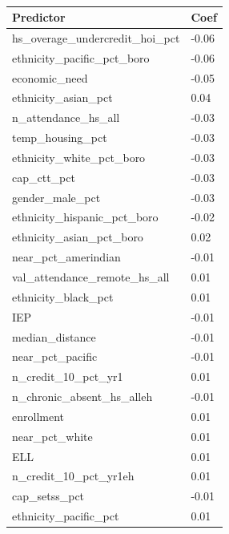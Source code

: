 \documentclass[
  man,floatsintext]{apa6}
\begin{document}
\begin{table}[H]

\begin{center}
\begin{threeparttable}

\caption{\label{tab:unnamed-chunk-13}}

\begin{tabular}{ll}
\toprule
Predictor & \multicolumn{1}{c}{Coef}\\
\midrule
hs\_overage\_undercredit\_hoi\_pct & -0.06\\
ethnicity\_pacific\_pct\_boro & -0.06\\
economic\_need & -0.05\\
ethnicity\_asian\_pct & 0.04\\
n\_attendance\_hs\_all & -0.03\\
temp\_housing\_pct & -0.03\\
ethnicity\_white\_pct\_boro & -0.03\\
cap\_ctt\_pct & -0.03\\
gender\_male\_pct & -0.03\\
ethnicity\_hispanic\_pct\_boro & -0.02\\
ethnicity\_asian\_pct\_boro & 0.02\\
near\_pct\_amerindian & -0.01\\
val\_attendance\_remote\_hs\_all & 0.01\\
ethnicity\_black\_pct & 0.01\\
IEP & -0.01\\
median\_distance & -0.01\\
near\_pct\_pacific & -0.01\\
n\_credit\_10\_pct\_yr1 & 0.01\\
n\_chronic\_absent\_hs\_alleh & -0.01\\
enrollment & 0.01\\
near\_pct\_white & 0.01\\
ELL & 0.01\\
n\_credit\_10\_pct\_yr1eh & 0.01\\
cap\_setss\_pct & -0.01\\
ethnicity\_pacific\_pct & 0.01\\
\bottomrule
\end{tabular}

\end{threeparttable}
\end{center}

\end{table}
\end{document}

